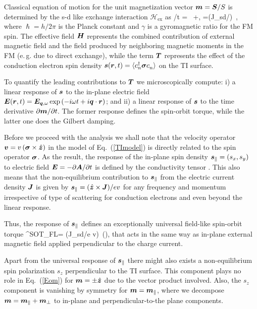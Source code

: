 Classical equation of motion for the unit magnetization vector $\boldsymbol{m}=\boldsymbol{S}/S$ is determined by the s-d like exchange interaction $\mathcal{H}_\textrm{ex}$ as
\be
\label{Eom}
\pa {}/\pa t = \gamma\,  \times{}+,\quad
{}=(J_\textrm{sd}/\hslash) \,\times{},
\e
where $\hslash=h/2\pi$ is the Planck constant and $\gamma$ is a gyromagnetic ratio for the FM spin. The effective field $\boldsymbol{H}$ represents the combined contribution of external magnetic field and the field produced by neighboring magnetic moments in the FM (e.\,g. due to direct exchange), while the term $\boldsymbol{T}$ represents the effect of the conduction electron spin density $\bb{s}(\bb{r},t)= \la c\h_n \bb{\sigma} c\0_n\ra$  on the TI surface. 

To quantify the leading contributions to $\boldsymbol{T}$ we microscopically compute: i) a linear response of $\boldsymbol{s}$ to the in-plane electric field $\boldsymbol{E}(\boldsymbol{r},t)= \boldsymbol{E}_{\boldsymbol{q},\omega}\exp\left(-i\omega t+i\boldsymbol{q}\cdot\boldsymbol{r}\right)$; and ii) a linear response of $\boldsymbol{s}$  to the time derivative $\partial \boldsymbol{m}/\partial t$. The former response defines the spin-orbit torque, while the latter one does the Gilbert damping. 
 
Before we proceed with the analysis we shall note that the velocity operator $\boldsymbol{v} = v\,(\boldsymbol{\sigma}\times \hat{\boldsymbol{z}})$ in the model of Eq.~(\ref{TImodel})  is directly related to the spin operator $\boldsymbol{\sigma}$. As the result, the response of the in-plane spin density $\boldsymbol{s}_\parallel=(s_{x}, s_{y})$ to electric field $\boldsymbol{E}=-\partial\boldsymbol{A}/\partial t$ is defined by the conductivity tensor \cite{ndiaye_dirac_2017,Ghosh18}. This also means that the non-equilibrium contribution to $\boldsymbol{s}_\parallel$ from the electric current density $\boldsymbol{J}$ is given by $\boldsymbol{s}_\parallel= (\hat{\boldsymbol{z}}\times\boldsymbol{J} )/ev$ for any frequency and momentum irrespective of type of scattering for conduction electrons and even beyond the linear response. 

Thus, the response of $\boldsymbol{s}_\parallel$ defines an exceptionally universal field-like spin-orbit torque
\be
\label{TFL}
^\textrm{SOT}_\textrm{FL}= (J_\textrm{sd}/\hslash e v)\, \times(\times{}),
\e 
that acts in the same way as in-plane external magnetic field applied perpendicular to the charge current. 

Apart from the universal response of $\boldsymbol{s}_\parallel$ there might also exists a non-equilibrium spin polarization $s_z$ perpendicular to the TI surface. This component plays no role in Eq.~(\ref{Eom}) for $\boldsymbol{m}= \pm \hat{\boldsymbol{z}}$ due to the vector product involved. Also, the $s_z$ component is vanishing by symmetry for $\boldsymbol{m}=\boldsymbol{m}_\parallel$, where we decompose $\boldsymbol{m} =\boldsymbol{m}_\parallel+\boldsymbol{m}_\perp$ to in-plane and perpendicular-to-the plane components.

